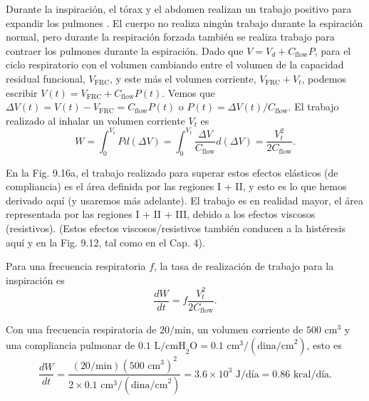 \documentclass[12pt]{book}
\begin{document}
Durante la inspiración, el tórax y el abdomen realizan un trabajo positivo para expandir los pulmones \cite{1, 12, 18, 42}. El cuerpo no realiza ningún trabajo durante la espiración normal, pero durante la respiración forzada también se realiza trabajo para contraer los pulmones durante la espiración. Dado que $V = V_d + C_{\text{flow}} P$, para el ciclo respiratorio con el volumen cambiando entre el volumen de la capacidad residual funcional, $V_{\text{FRC}}$, y este más el volumen corriente, $V_{\text{FRC}} + V_t$, podemos escribir $V(t) = V_{\text{FRC}} + C_{\text{flow}} P(t)$. Vemos que $\Delta V(t) = V(t) - V_{\text{FRC}} = C_{\text{flow}} P(t)$ o $P(t) = \Delta V(t)/C_{\text{flow}}$. El trabajo realizado al inhalar un volumen corriente $V_t$ es
\begin{equation}
W = \int_{0}^{V_t} P d(\Delta V) = \int_{0}^{V_t} \frac{\Delta V}{C_{\text{flow}}} d(\Delta V) = \frac{V_t^2}{2C_{\text{flow}}}. \label{eq:9.17}
\end{equation}

En la Fig. 9.16a, el trabajo realizado para superar estos efectos elásticos (de compliancia) es el área definida por las regiones I + II, y esto es lo que hemos derivado aquí (y usaremos más adelante). El trabajo es en realidad mayor, el área representada por las regiones I + II + III, debido a los efectos viscosos (resistivos). (Estos efectos viscosos/resistivos también conducen a la histéresis aquí y en la Fig. 9.12, tal como en el Cap. 4).

Para una frecuencia respiratoria $f$, la tasa de realización de trabajo para la inspiración es
\begin{equation}
\frac{dW}{dt} = f \frac{V_t^2}{2C_{\text{flow}}}. \label{eq:9.18}
\end{equation}

Con una frecuencia respiratoria de $20/\text{min}$, un volumen corriente de $500\text{ cm}^3$ y una compliancia pulmonar de $0.1\text{ L/cmH}_2\text{O} = 0.1\text{ cm}^3/(\text{dina/cm}^2)$, esto es
\begin{equation}
\frac{dW}{dt} = \frac{(20/\text{min})(500\text{ cm}^3)^2}{2 \times 0.1\text{ cm}^3/(\text{dina/cm}^2)} = 3.6 \times 10^3\text{ J/día} = 0.86\text{ kcal/día}. \label{eq:9.19}
\end{equation}
\end{document}
